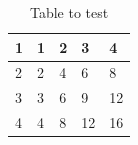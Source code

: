 \documentclass{article}
\begin{document}
\begin{table}[]
\begin{tabular}{|l|l|l|l|l|}
\hline
\rowcolor[HTML]{9AEAEA} 
\cellcolor[HTML]{E1BCF9}1 & 1 & 2 & 3 & 4 \\ \hline
\cellcolor[HTML]{E1BCF9}2 & 2 & 4 & 6 & 8 \\ \hline
\cellcolor[HTML]{E1BCF9}3 & 3 & 6 & 9 & 12 \\ \hline
\cellcolor[HTML]{E1BCF9}4 & 4 & 8 & 12 & 16 \\ \hline
\end{tabular}
\caption{Table to test}
\label{table:1}
\end{table}
\end{document}
